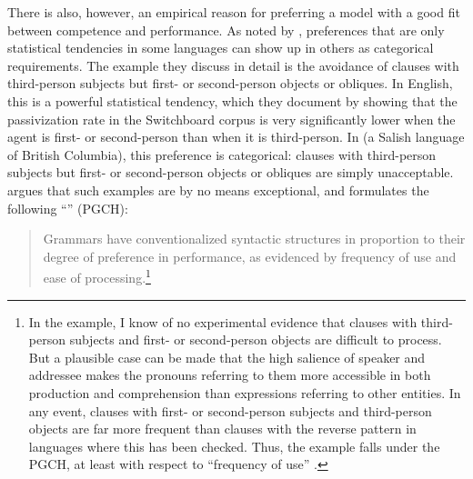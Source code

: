 \documentclass[a4paper]{article}
\begin{document}
There is also, however, an empirical reason for preferring a model with a good fit between competence and performance.  As noted by \citet{BresnanEtAl2001}, preferences that are only statistical tendencies in some languages can show up in others as categorical requirements.  The example they discuss in detail is the avoidance of clauses with third-person subjects but first- or second-person objects or obliques. In English, this is a powerful statistical tendency, which they document by showing that the passivization rate in the Switchboard corpus is very significantly lower when the agent is first- or second-person than when it is third-person.  In  (a Salish language of British Columbia), this preference is categorical:  clauses with third-person subjects but first- or second-person objects or obliques are simply unacceptable.  \citet{Hawkins2004a-u,Hawkins2014} argues that such examples are by no means exceptional, and formulates the following ``'' (PGCH):
\begin{quote}
Grammars  have  conventionalized  syntactic  structures  in  proportion   to their degree of
preference in performance, as evidenced by frequency of use and ease of processing.\footnote{In the
  \citeauthor{BresnanEtAl2001} example, I know of no experimental evidence that clauses with
  third-person subjects and first- or second-person objects are difficult to process.  But a
  plausible case can be made that the high salience of speaker and addressee makes the pronouns
  referring to them more accessible in both production and comprehension than expressions referring
  to other entities.  In any event, clauses with first- or second-person subjects and third-person
  objects are far more frequent than clauses with the reverse pattern in languages where this has
  been checked.  Thus, the \citeauthor{BresnanEtAl2001} example falls under the PGCH, at least with
  respect to ``frequency of use'' .}
\end{quote}
\end{document}
